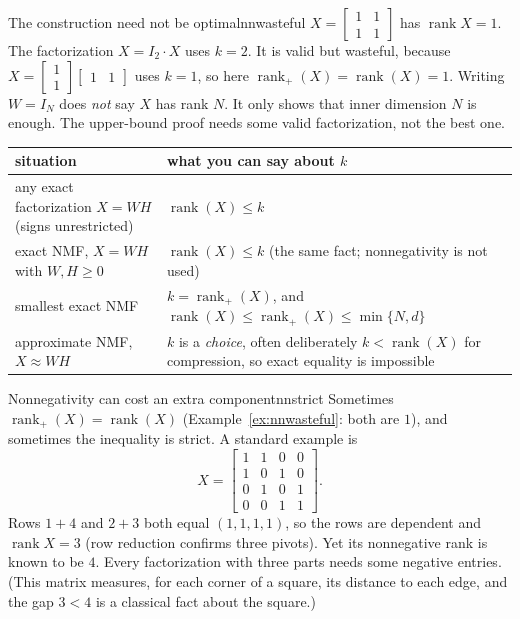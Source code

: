 \documentclass[11pt]{article}
\newcommand{\rank}{\operatorname{rank}}
\begin{document}
\begin{example}{The construction need not be optimal}{nnwasteful}
$X=\begin{bmatrix}1&1\\1&1\end{bmatrix}$ has $\rank X=1$. The factorization $X=I_2\cdot X$ uses $k=2$. It is valid but
wasteful, because $X=\begin{bmatrix}1\\1\end{bmatrix}\begin{bmatrix}1&1\end{bmatrix}$ uses $k=1$, so here
$\operatorname{rank}_+(X)=\rank(X)=1$. Writing $W=I_N$ does \emph{not} say $X$ has rank $N$. It only shows
that inner dimension $N$ is enough. The upper-bound proof needs some valid factorization, not the best one.
\end{example}

\begin{center}
\renewcommand{\arraystretch}{1.35}
\small
\begin{tabular}{@{}>{\raggedright\arraybackslash}p{4.6cm}>{\raggedright\arraybackslash}p{9.2cm}@{}}
\toprule
situation & what you can say about $k$ \\
\midrule
any exact factorization $X=WH$ (signs unrestricted) & $\rank(X)\le k$ \\
exact NMF, $X=WH$ with $W,H\ge0$ & $\rank(X)\le k$ (the same fact; nonnegativity is not used) \\
smallest exact NMF & $k=\operatorname{rank}_+(X)$, and $\rank(X)\le\operatorname{rank}_+(X)\le\min\{N,d\}$ \\
approximate NMF, $X\approx WH$ & $k$ is a \emph{choice}, often deliberately $k<\rank(X)$ for compression, so exact equality is impossible \\
\bottomrule
\end{tabular}
\end{center}

\begin{example}{Nonnegativity can cost an extra component}{nnstrict}
Sometimes $\operatorname{rank}_+(X)=\rank(X)$ (Example~\ref{ex:nnwasteful}: both are $1$), and sometimes the inequality is strict. A standard example is
\[
X=\begin{bmatrix}1&1&0&0\\1&0&1&0\\0&1&0&1\\0&0&1&1\end{bmatrix}.
\]
Rows $1+4$ and $2+3$ both equal $(1,1,1,1)$, so the rows are dependent and $\rank X=3$ (row reduction confirms
three pivots). Yet its nonnegative rank is known to be $4$. Every factorization with three parts needs
some negative entries. (This matrix measures, for each corner of a square, its distance to each edge, and the
gap $3<4$ is a classical fact about the square.)
\end{example}
\end{document}
